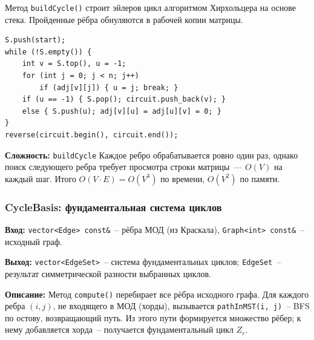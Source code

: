 Метод \texttt{buildCycle()} строит эйлеров цикл алгоритмом Хирхольцера
на основе стека. Пройденные рёбра обнуляются в рабочей копии матрицы.

\begin{lstlisting}[style=cstyle, caption={Построение эйлерова цикла (euler.cpp)}]
S.push(start);
while (!S.empty()) {
    int v = S.top(), u = -1;
    for (int j = 0; j < n; j++)
        if (adj[v][j]) { u = j; break; }
    if (u == -1) { S.pop(); circuit.push_back(v); }
    else { S.push(u); adj[v][u] = adj[u][v] = 0; }
}
reverse(circuit.begin(), circuit.end());
\end{lstlisting}

\textbf{Сложность:}
\texttt{buildCycle}
Каждое ребро обрабатывается ровно один раз, однако поиск следующего
ребра требует просмотра строки матрицы~--- $O(V)$ на каждый шаг.
Итого $O(V \cdot E) = O(V^3)$ по времени, $O(V^2)$ по памяти.

\subsubsection{CycleBasis: фундаментальная система циклов}

\textbf{Вход:} \texttt{vector<Edge> const\&}~-- рёбра МОД (из Краскала),
\texttt{Graph<int> const\&}~-- исходный граф.

\textbf{Выход:} \texttt{vector<EdgeSet>}~-- система фундаментальных циклов;
\texttt{EdgeSet}~-- результат симметрической разности выбранных циклов.

\textbf{Описание:} Метод \texttt{compute()} перебирает все рёбра исходного
графа. Для каждого ребра $(i,j)$, не входящего в МОД (хорды), вызывается
\texttt{pathInMST(i, j)}~-- BFS по остову, возвращающий путь.
Из этого пути формируется множество рёбер; к нему добавляется хорда~--
получается фундаментальный цикл $Z_e$.


